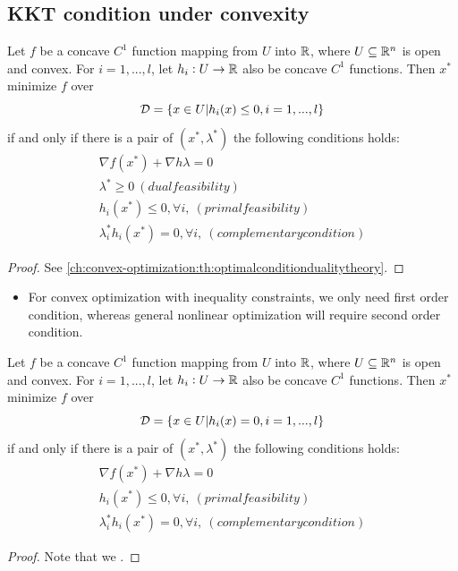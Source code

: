 \begin{refsection}
\subsection{KKT condition under convexity}
\begin{theorem}\label{ch:convex-optimization:KKTconditionunderconvexityinequalityconstraint}
\cite[187]{sundaram1996first} Let $f$ be a concave $C^1$ function mapping from $U$ into $\mathbb{R}$, where $U\subseteq \mathbb{R}^n$ is open and convex. For $i=1,...,l$, let $h_i: U\to \mathbb{R}$ also be concave $C^1$ functions. 
Then $x^*$ minimize $f$ over
$$\mathcal{D} = \{x\in U| h_i(x) \leq 0,i=1,...,l\}$$
if and only if there is a pair of $(x^*,\lambda^*) $ the following conditions holds:
\begin{align*}
\nabla f(x^*) + \nabla h \lambda = 0\\
\lambda^*\geq 0~(dual feasibility)\\
h_i(x^*) \leq 0, \forall i, ~(primal feasibility)\\
\lambda^*_i h_i(x^*) = 0,\forall i, ~(complementary condition)
\end{align*}
\end{theorem}
\begin{proof}
See \autoref{ch:convex-optimization:th:optimalconditiondualitytheory}.
\end{proof}

\begin{remark}\hfill
\begin{itemize}
	\item For convex optimization with inequality constraints, we only need first order condition, whereas general nonlinear optimization will require second order condition.
\end{itemize}
\end{remark}


\begin{corollary}\label{ch:convex-optimization:KKTconditionunderconvexityequalityconstraint}
	\cite[187]{sundaram1996first} Let $f$ be a concave $C^1$ function mapping from $U$ into $\mathbb{R}$, where $U\subseteq \mathbb{R}^n$ is open and convex. For $i=1,...,l$, let $h_i: U\to \mathbb{R}$ also be concave $C^1$ functions. Then $x^*$ minimize $f$ over
	$$\mathcal{D} = \{x\in U| h_i(x) = 0,i=1,...,l\}$$
	if and only if there is a pair of $(x^*,\lambda^*) $ the following conditions holds:
	\begin{align*}
	\nabla f(x^*) + \nabla h \lambda = 0\\
	h_i(x^*) \leq 0, \forall i, ~(primal feasibility)\\
	\lambda^*_i h_i(x^*) = 0,\forall i, ~(complementary condition)
	\end{align*}
\end{corollary}
\begin{proof}
Note that we .
\end{proof}


\end{refsection}
